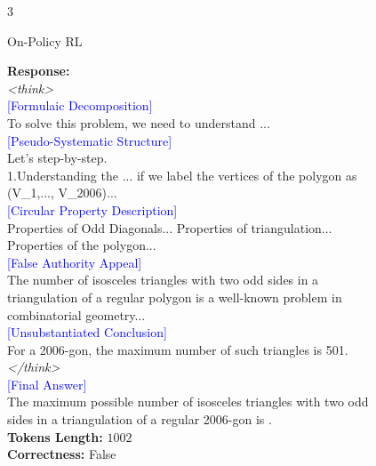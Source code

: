 \begin{figure}[h]
{\begin{tcolorbox}[center,breakable,title=\Large\centering{Case Study}]
\begin{multicols}{3}
\begin{center}
{\Large {On-Policy RL}}
\end{center}
\textcolor{my_green}{\textbf{Response:}}\\
\textit{<think>}\\
\textcolor{blue}{[Formulaic Decomposition]}\\
To solve this problem, we need to understand ... \\
\textcolor{blue}{[Pseudo-Systematic Structure]}\\
Let's step-by-step.
\\1.Understanding the ... if we label the vertices of the polygon as (V\_1,..., V\_{2006})... \\
\textcolor{blue}{[Circular Property Description]}\\
Properties of Odd Diagonals... Properties of triangulation... Properties of the polygon... \\
\textcolor{blue}{[False Authority Appeal]}\\
The number of isosceles triangles with two odd sides in a triangulation of a regular polygon is a well-known problem in combinatorial geometry... \\
\textcolor{blue}{[Unsubstantiated Conclusion]}\\
For a 2006-gon, the maximum number of such triangles is 501.\\
\textit{</think>}\\
\textcolor{blue}{[Final Answer]}\\
The maximum possible number of isosceles triangles with two odd sides in a triangulation of a regular 2006-gon is .\\
\textcolor{my_purple}{\textbf{Tokens Length:}} $1002$\\
\textcolor{my_blue}{\textbf{Correctness:}} False
\\\\\\\\\\\\\\
\columnbreak


\end{multicols}
\end{tcolorbox}}
\end{figure}
